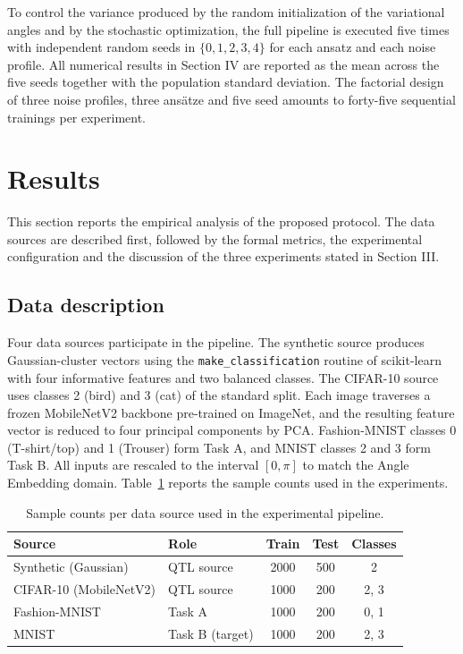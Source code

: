 \documentclass[conference]{IEEEtran}
\begin{document}
To control the variance produced by the random initialization of the variational angles and by the stochastic optimization, the full pipeline is executed five times with independent random seeds in $\{0, 1, 2, 3, 4\}$ for each ansatz and each noise profile. All numerical results in Section IV are reported as the mean across the five seeds together with the population standard deviation. The factorial design of three noise profiles, three ans\"atze and five seed amounts to forty-five sequential trainings per experiment.

\section{Results}
This section reports the empirical analysis of the proposed protocol. The data sources are described first, followed by the formal metrics, the experimental configuration and the discussion of the three experiments stated in Section III.

\subsection{Data description}
Four data sources participate in the pipeline. The synthetic source produces Gaussian-cluster vectors using the \texttt{make\_classification} routine of scikit-learn with four informative features and two balanced classes. The CIFAR-10 source uses classes 2 (bird) and 3 (cat) of the standard split. Each image traverses a frozen MobileNetV2 backbone pre-trained on ImageNet, and the resulting feature vector is reduced to four principal components by PCA. Fashion-MNIST classes 0 (T-shirt/top) and 1 (Trouser) form Task A, and MNIST classes 2 and 3 form Task B. All inputs are rescaled to the interval $[0, \pi]$ to match the Angle Embedding domain. Table~\ref{tab:datasets} reports the sample counts used in the experiments.

\begin{table}[ht]
\caption{Sample counts per data source used in the experimental pipeline.}
\label{tab:datasets}
\centering
\begin{tabular}{llccc}
\toprule
Source & Role & Train & Test & Classes \\
\midrule
Synthetic (Gaussian) & QTL source & 2000 & 500 & 2 \\
CIFAR-10 (MobileNetV2) & QTL source & 1000 & 200 & 2, 3 \\
Fashion-MNIST & Task A & 1000 & 200 & 0, 1 \\
MNIST & Task B (target) & 1000 & 200 & 2, 3 \\
\bottomrule
\end{tabular}
\end{table}
\end{document}
